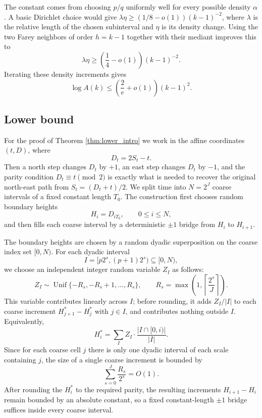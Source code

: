 \documentclass[11pt]{article}
\theoremstyle{definition}
\theoremstyle{remark}
\newcommand{\1}{\mathbf 1}
\begin{document}
\bigskip
\noindent
The constant comes from choosing $p/q$ uniformly well for every possible density $\alpha$. A basic Dirichlet choice would give $\lambda\eta\ge (1/8-o(1))(k-1)^{-2}$, where $\lambda$ is the relative length of the chosen subinterval and $\eta$ is its density change. Using the two Farey neighbors of order $h=k-1$ together with their mediant improves this to
\[
\lambda\eta\ge \left(\frac14-o(1)\right)(k-1)^{-2}.
\]
Iterating these density increments gives
\[
\log A(k)\le \left(\frac2e+o(1)\right)(k-1)^2.
\]

\subsection{Lower bound}

For the proof of Theorem \ref{thm:lower_intro} we work in the affine coordinates $(t,D)$, where
\[
D_t=2S_t-t.
\]
Then a north step changes $D_t$ by $+1$, an east step changes $D_t$ by $-1$, and the parity condition $D_t\equiv t\pmod 2$ is exactly what is needed to recover the original north-east path from $S_t=(D_t+t)/2$. We split time into $N=2^J$ coarse intervals of a fixed constant length $T_0$. The construction first chooses random boundary heights
\[
H_i=D_{iT_0},\qquad 0\le i\le N,
\]
and then fills each coarse interval by a deterministic $\pm1$ bridge from $H_i$ to $H_{i+1}$.

\bigskip
\noindent
The boundary heights are chosen by a random dyadic superposition on the coarse index set $[0,N)$. For each dyadic interval
\[
I=[p2^s,(p+1)2^s)\subseteq[0,N),
\]
we choose an independent integer random variable $Z_I$ as follows:
\[
Z_I\sim \operatorname{Unif}\{-R_s,-R_s+1,\ldots,R_s\},
\qquad
R_s=\max\left(1,\left\lceil\frac{2^s}{J}\right\rceil\right).
\]
This variable contributes linearly across $I$; before rounding, it adds $Z_I/|I|$ to each coarse increment $H_{j+1}^*-H_j^*$ with $j\in I$, and contributes nothing outside $I$. Equivalently,
\[
H_i^*=\sum_I Z_I\cdot\frac{|I\cap[0,i)|}{|I|}.
\]
Since for each coarse cell $j$ there is only one dyadic interval of each scale containing $j$, the size of a single coarse increment is bounded by
\[
\sum_{s=0}^J \frac{R_s}{2^s}=O(1).
\]
After rounding the $H_i^*$ to the required parity, the resulting increments $H_{i+1}-H_i$ remain bounded by an absolute constant, so a fixed constant-length $\pm1$ bridge suffices inside every coarse interval.
\end{document}
